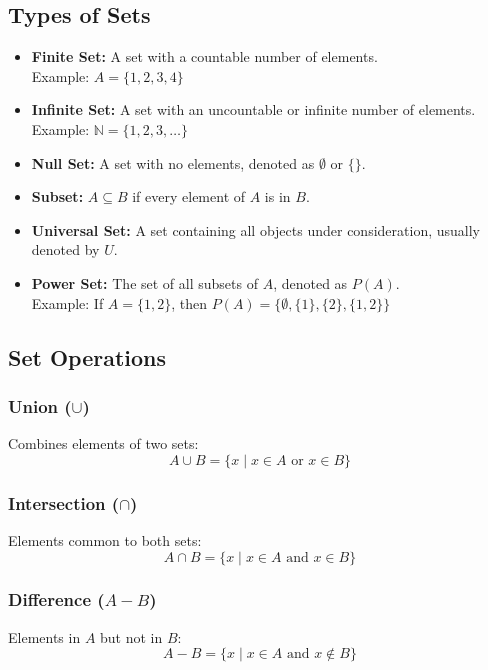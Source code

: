 \subsection{Types of Sets}
\begin{itemize}
    \item \textbf{Finite Set:} A set with a countable number of elements. \\
    Example: \(A = \{1, 2, 3, 4\} \)
    
    \item \textbf{Infinite Set:} A set with an uncountable or infinite number of elements. \\
    Example: \(\mathbb{N} = \{1, 2, 3, \dots\} \)

    \item \textbf{Null Set:} A set with no elements, denoted as \(\emptyset\) or \(\{\}\).

    \item \textbf{Subset:} \(A \subseteq B\) if every element of \(A\) is in \(B\).

    \item \textbf{Universal Set:} A set containing all objects under consideration, usually denoted by \(U\).

    \item \textbf{Power Set:} The set of all subsets of \(A\), denoted as \(P(A)\). \\
    Example: If \(A = \{1, 2\}\), then \(P(A) = \{\emptyset, \{1\}, \{2\}, \{1, 2\}\} \)
\end{itemize}

\subsection{Set Operations}
\subsubsection{Union (\(\cup\))}
Combines elements of two sets:
\[
    A \cup B = \{x \mid x \in A \text{ or } x \in B\}
\]
\subsubsection{Intersection (\(\cap\))}
Elements common to both sets:
\[
    A \cap B = \{x \mid x \in A \text{ and } x \in B\}
\]
\subsubsection{Difference (\(A - B\))}
Elements in \(A\) but not in \(B\):
\[
    A - B = \{x \mid x \in A \text{ and } x \notin B\}
\]
